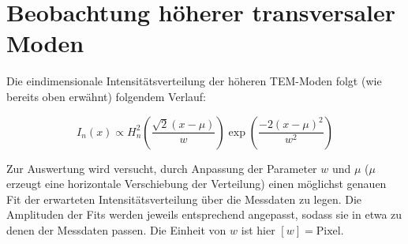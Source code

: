 \documentclass[bigchapter,colorback,accentcolor=tud4b,linedtoc,11pt]{tudreport}
\numberwithin{equation}{subsection}
\begin{document}
\section{Beobachtung höherer transversaler Moden}

Die eindimensionale Intensitätsverteilung der höheren TEM-Moden folgt (wie bereits oben erwähnt) folgendem Verlauf:

$$I_{n}(x) \propto H_n^2 \left( \frac{\sqrt{2}(x-\mu)}{w} \right) \exp \left( \frac{- 2 (x-\mu)^2}{w^2} \right)  $$

Zur Auswertung wird versucht, durch Anpassung der Parameter $w$ und \(\mu\) (\(\mu\) erzeugt eine horizontale Verschiebung der Verteilung) einen möglichst genauen Fit der erwarteten Intensitätsverteilung über die Messdaten zu legen. Die Amplituden der Fits werden jeweils entsprechend angepasst, sodass sie in etwa zu denen der Messdaten passen. Die Einheit von $w$ ist hier $[w] = \mathrm{Pixel}$.
\end{document}
